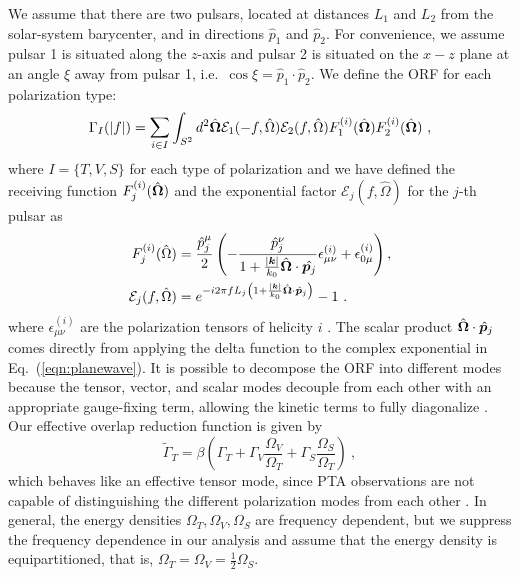 \documentclass[prd,twocolumn,aps,psfig,nofootinbib,nobibnotes,superscriptaddress,preprintnumbers,times]{revtex4-2}
\begin{document}
We assume that there are two pulsars, located at distances $L_1$ and $L_2$ from the solar-system barycenter, and in directions $\hat{p}_1$ and $\hat{p}_2$. For convenience, we assume pulsar 1 is situated along the $z$-axis and pulsar 2 is situated on the $x-z$ plane at an angle $\xi$ away from pulsar 1, i.e.~$\cos \xi = \hat{p}_1 \cdot \hat{p}_2$. We define the ORF for each polarization type: 
\begin{equation}\label{eq:orf_type}
    \Gamma_I(|f|) = \mathlarger{\sum}_{i \in I} \int_{S^2} d^2 \hat{\bf{\Omega}} \mathcal{E}_1(-f, \hat{\Omega}) \mathcal{E}_2(f, \hat{\Omega}) F_1^{(i)}(\hat{\bf{\Omega}}) F_2^{(i)}(\hat{\bf{\Omega}}) \ ,
\end{equation}
where $I = \{T,V,S\}$ for each type of polarization and we have defined the receiving function $F^{(i)}_j(\hat{\bf \Omega})$ and the exponential factor $\mathcal{E}_j(f, \hat{\Omega})$ for the $j$-th pulsar as 
\begin{equation}\label{eqn:recieving}
    \begin{aligned}
        F^{(i)}_j(\hat{\Omega}) &= \frac{\hat{p}^\mu_j}{2}\left(-\frac{\hat{p}^\nu_j}{1+\frac{|\boldsymbol{k}|}{k_0} \hat{\boldsymbol{\Omega}} \cdot \hat{{\boldsymbol{p}}_j}} \epsilon_{\mu \nu}^{(i)}+\epsilon_{0 \mu}^{(i)}\right) , \\ 
        \mathcal{E}_j(f, \hat{\Omega}) &= e^{-i2\pi f L_j\left( 1 + \frac{|\boldsymbol{k}|}{k_0} \hat{\bf \Omega}\cdot \hat{\boldsymbol{p}}_j\right)} - 1 \ . 
    \end{aligned}
\end{equation}
where $\epsilon_{\mu\nu}^{(i)}$ are the polarization tensors of helicity $i$ \cite{Liang:2021bct}. The scalar product $\hat{\bf \Omega}\cdot \hat{\boldsymbol{p}}_j$ comes directly from applying the delta function to the complex exponential in 
Eq.~(\ref{eqn:planewave}). 
It is possible to decompose the ORF into different modes because the tensor, vector, and scalar modes decouple from each other with an appropriate gauge-fixing term, allowing the kinetic terms to fully diagonalize \cite{Hinterbichler:2011tt}. Our effective overlap reduction function is given by 
\begin{equation}\label{eq:eff_orf}
    \tilde{\Gamma}_{T} = \beta \left(\Gamma_{T} + \Gamma_{V} \frac{\Omega_V}{\Omega_T} + \Gamma_{S} \frac{\Omega_S}{\Omega_T} \right) \ ,
\end{equation}
which behaves like an effective tensor mode, since PTA observations are not capable of distinguishing the different polarization modes from each other \cite{Liang:2021bct}. In general, the energy densities $\Omega_T, \Omega_V,\Omega_S$ are frequency dependent, but we suppress the frequency dependence in our analysis and assume that the energy density is equipartitioned, that is, $\Omega_T = \Omega_V = \frac{1}{2}\Omega_S$. 
\end{document}
